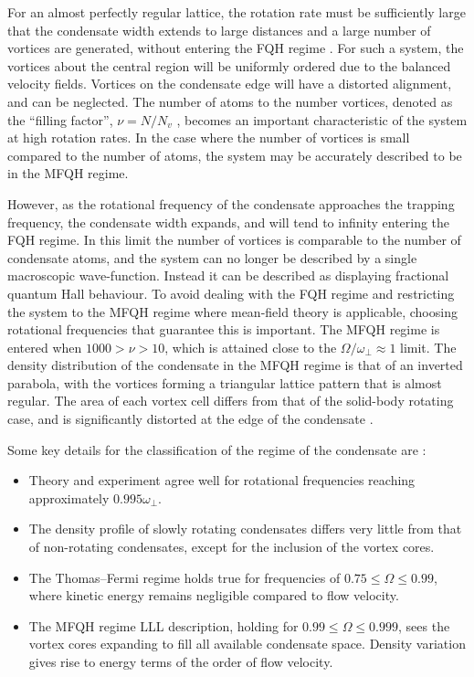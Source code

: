 For an almost perfectly regular lattice, the rotation rate must be sufficiently large that the condensate width extends to large distances and a large number of vortices are generated, without entering the FQH regime \cite{Vtx:Aftalion_pra_2005}. For such a system, the vortices about the central region will be uniformly ordered due to the balanced velocity fields. Vortices on the condensate edge will have a distorted alignment, and can be neglected. The number of atoms to the number vortices, denoted as the ``filling factor'', $\nu=N/N_v$ \cite{BK:Ueda_2010,Vtx:Ho_prl_2001}, becomes an important characteristic of the system at high rotation rates. In the case where the number of vortices is small compared to the number of atoms, the system may be accurately described to be in the MFQH regime.

However, as the rotational frequency of the condensate approaches the trapping frequency, the condensate width expands, and will tend to infinity entering the FQH regime. In this limit the number of vortices is comparable to the number of condensate atoms, and the system can no longer be described by a single macroscopic wave-function. Instead it can be described as displaying fractional quantum Hall behaviour. To avoid dealing with the FQH regime and restricting the system to the MFQH regime where mean-field theory is applicable, choosing rotational frequencies that guarantee this is important. The MFQH regime is entered when $1000 > \nu > 10$, which is attained close to the $\Omega / \omega_{\perp}\approx 1$ limit. The density distribution of the condensate in the MFQH regime is that of an inverted parabola, with the vortices forming a triangular lattice pattern that is almost regular. The area of each vortex cell differs from that of the solid-body rotating case, and is significantly distorted at the edge of the condensate \cite{Vtx:Schweikhard_prl_2004}.

Some key details for the classification of the regime of the condensate are \cite{Fetter_rmp_2009}:
\begin{itemize}
\item Theory and experiment agree well for rotational frequencies reaching approximately $0.995\omega_{\perp}$.
\item The density profile of slowly rotating condensates differs very little from that of non-rotating condensates, except for the inclusion of the vortex cores.
\item The Thomas--Fermi regime holds true for frequencies of $0.75 \leq \Omega \leq 0.99$, where kinetic energy remains negligible compared to flow velocity.
\item The MFQH regime LLL description, holding for $0.99 \leq \Omega \leq 0.999$, sees the vortex cores expanding to fill all available condensate space. Density variation gives rise to energy terms of the order of flow velocity.
\end{itemize}

